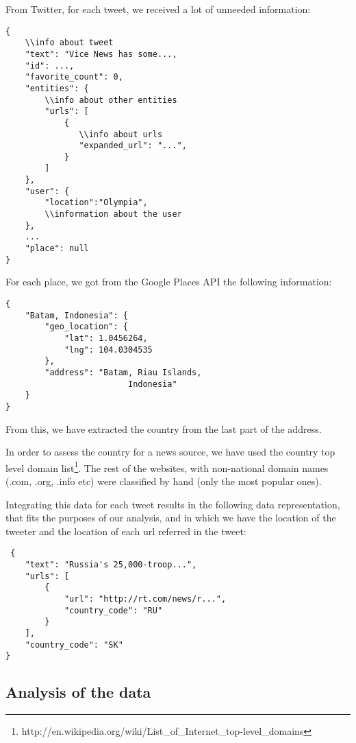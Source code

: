 \documentclass{acm_proc_10ptArticle-sp}
\begin{document}
From Twitter, for each tweet, we received a lot of unneeded information: 

\begin{verbatim}
{
    \\info about tweet
    "text": "Vice News has some...,
    "id": ...,
    "favorite_count": 0,
    "entities": {
        \\info about other entities
        "urls": [
            {
               \\info about urls
               "expanded_url": "...",
            }
        ]
    },
    "user": {
        "location":"Olympia",
        \\information about the user
    },
    ...
    "place": null
}
\end{verbatim}

For each place, we got from the Google Places API the following information: 
\begin{verbatim}
{
    "Batam, Indonesia": {
        "geo_location": {
            "lat": 1.0456264,
            "lng": 104.0304535
        },
        "address": "Batam, Riau Islands, 
                         Indonesia"
    }
}
\end{verbatim}

From this, we have extracted the country from the last part of the address.

In order to assess the country for a news source, we have used the country top level domain list\footnote{http://en.wikipedia.org/wiki/List\_of\_Internet\_top-level\_domains}. The rest of the websites, with non-national domain names (.com, .org, .info etc) were classified by hand (only the most popular ones). 

Integrating this data for each tweet results in the following data representation, that fits the purposes of our analysis, and in which we have the location of the tweeter and the location of each url referred in the tweet:

\begin{verbatim}
 {
    "text": "Russia's 25,000-troop...",
    "urls": [
        {
            "url": "http://rt.com/news/r...",
            "country_code": "RU"
        }
    ],
    "country_code": "SK"
}
\end{verbatim}

\subsection{Analysis of the data}
\end{document}
